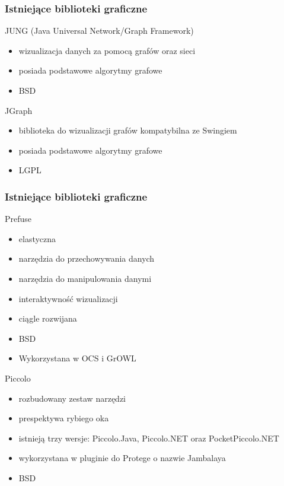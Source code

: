 \documentclass[xcolor=dvipsnames,9pt]{beamer}
\begin{document}
\begin{frame}
	\frametitle{Istniejące biblioteki graficzne}
	\begin{block}{JUNG (Java Universal Network/Graph Framework)}
		\begin{itemize}
			\item	wizualizacja danych za pomocą grafów oraz sieci
			\item posiada podstawowe algorytmy grafowe
			\item BSD
	\end{itemize}
	\end{block}
	\begin{block}{JGraph}
		\begin{itemize}
			\item	 biblioteka do wizualizacji grafów kompatybilna ze Swingiem
				\item posiada podstawowe algorytmy grafowe
			\item LGPL
	\end{itemize}
	\end{block}
\end{frame}

\begin{frame}
	\frametitle{Istniejące biblioteki graficzne}
	\begin{block}{Prefuse}
		\begin{itemize}
			\item  elastyczna 
			\item narzędzia do przechowywania danych
			 \item narzędzia do manipulowania danymi 
			\item interaktywność wizualizacji 
                        \item ciągle rozwijana  
			\item BSD
			\item Wykorzystana w OCS i GrOWL     
		\end{itemize}
	\end{block}
	\begin{block}{Piccolo}
		\begin{itemize}
			\item	rozbudowany zestaw narzędzi 
			\item prespektywa rybiego oka
			\item  istnieją trzy wersje: Piccolo.Java, Piccolo.NET oraz PocketPiccolo.NET 
			\item wykorzystana w pluginie do Protege o nazwie Jambalaya
			\item BSD
	\end{itemize}
	\end{block}
\end{frame}
\end{document}
